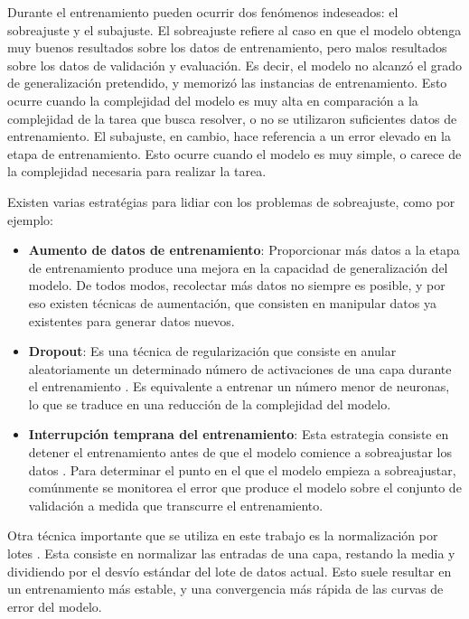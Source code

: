 Durante el entrenamiento pueden ocurrir dos fenómenos indeseados: el sobreajuste y el subajuste. 
El sobreajuste refiere al caso en que el modelo obtenga muy buenos resultados sobre los datos de entrenamiento, pero malos resultados sobre los datos de validación y evaluación. Es decir, el modelo no alcanzó el grado de generalización pretendido, y memorizó las instancias de entrenamiento. Esto ocurre cuando la complejidad del modelo es muy alta en comparación a la complejidad de la tarea que busca resolver, o no se utilizaron suficientes datos de entrenamiento. El subajuste, en cambio, hace referencia a un error elevado en la etapa de entrenamiento. Esto ocurre cuando el modelo es muy simple, o carece de la complejidad necesaria para realizar la tarea. 

Existen varias estratégias para lidiar con los problemas de sobreajuste, como por ejemplo:

\begin{itemize}
\item\textbf{Aumento de datos de entrenamiento}: Proporcionar más datos a la etapa de entrenamiento produce una mejora en la capacidad de generalización del modelo. De todos modos, recolectar más datos no siempre es posible, y por eso existen técnicas de aumentación, que consisten en manipular datos ya existentes para generar datos nuevos.  

\item\textbf{Dropout}: Es una técnica de regularización que consiste en anular aleatoriamente un determinado número de activaciones de una capa durante el entrenamiento \cite{drop}. Es equivalente a entrenar un número menor de neuronas, lo que se traduce en una reducción de la complejidad del modelo.  

\item\textbf{Interrupción temprana del entrenamiento}: Esta estrategia consiste en detener el entrenamiento antes de que el modelo comience a sobreajustar los datos \cite{bengio}.  Para determinar el punto en el que el modelo empieza a sobreajustar, comúnmente se monitorea el error que produce el modelo sobre el conjunto de validación a medida que transcurre el entrenamiento.
\end{itemize}

Otra técnica importante que se utiliza en este trabajo es la normalización por lotes \cite{batchnorm}. Esta consiste en normalizar las entradas de una capa, restando la media y dividiendo por el desvío estándar del lote de datos actual. Esto suele resultar en un entrenamiento más estable, y una convergencia más rápida de las curvas de error del modelo.

